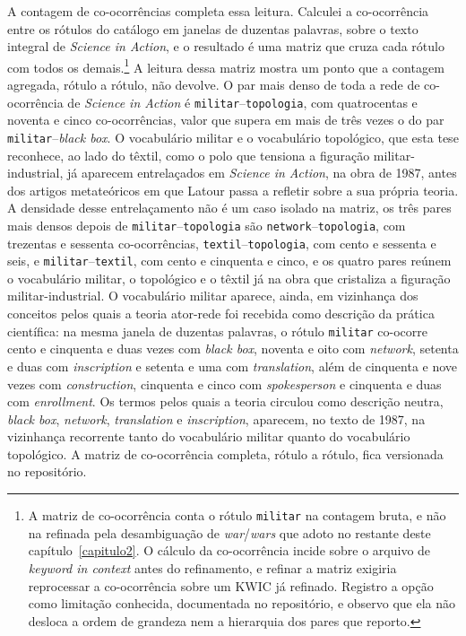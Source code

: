 A contagem de co-ocorrências completa essa leitura. Calculei a co-ocorrência entre os rótulos do catálogo em janelas de duzentas palavras, sobre o texto integral de \emph{Science in Action}, e o resultado é uma matriz que cruza cada rótulo com todos os demais.\footnote{A matriz de co-ocorrência conta o rótulo \texttt{militar} na contagem bruta, e não na refinada pela desambiguação de \textit{war}/\textit{wars} que adoto no restante deste capítulo~\ref{capitulo2}. O cálculo da co-ocorrência incide sobre o arquivo de \textit{keyword in context} antes do refinamento, e refinar a matriz exigiria reprocessar a co-ocorrência sobre um KWIC já refinado. Registro a opção como limitação conhecida, documentada no repositório, e observo que ela não desloca a ordem de grandeza nem a hierarquia dos pares que reporto.} A leitura dessa matriz mostra um ponto que a contagem agregada, rótulo a rótulo, não devolve. O par mais denso de toda a rede de co-ocorrência de \emph{Science in Action} é \texttt{militar}--\texttt{topologia}, com quatrocentas e noventa e cinco co-ocorrências, valor que supera em mais de três vezes o do par \texttt{militar}--\textit{black box}. O vocabulário militar e o vocabulário topológico, que esta tese reconhece, ao lado do têxtil, como o polo que tensiona a figuração militar-industrial, já aparecem entrelaçados em \emph{Science in Action}, na obra de 1987, antes dos artigos metateóricos em que Latour passa a refletir sobre a sua própria teoria. A densidade desse entrelaçamento não é um caso isolado na matriz, os três pares mais densos depois de \texttt{militar}--\texttt{topologia} são \texttt{network}--\texttt{topologia}, com trezentas e sessenta co-ocorrências, \texttt{textil}--\texttt{topologia}, com cento e sessenta e seis, e \texttt{militar}--\texttt{textil}, com cento e cinquenta e cinco, e os quatro pares reúnem o vocabulário militar, o topológico e o têxtil já na obra que cristaliza a figuração militar-industrial. O vocabulário militar aparece, ainda, em vizinhança dos conceitos pelos quais a teoria ator-rede foi recebida como descrição da prática científica: na mesma janela de duzentas palavras, o rótulo \texttt{militar} co-ocorre cento e cinquenta e duas vezes com \textit{black box}, noventa e oito com \textit{network}, setenta e duas com \textit{inscription} e setenta e uma com \textit{translation}, além de cinquenta e nove vezes com \textit{construction}, cinquenta e cinco com \textit{spokesperson} e cinquenta e duas com \textit{enrollment}. Os termos pelos quais a teoria circulou como descrição neutra, \textit{black box}, \textit{network}, \textit{translation} e \textit{inscription}, aparecem, no texto de 1987, na vizinhança recorrente tanto do vocabulário militar quanto do vocabulário topológico. A matriz de co-ocorrência completa, rótulo a rótulo, fica versionada no repositório.

